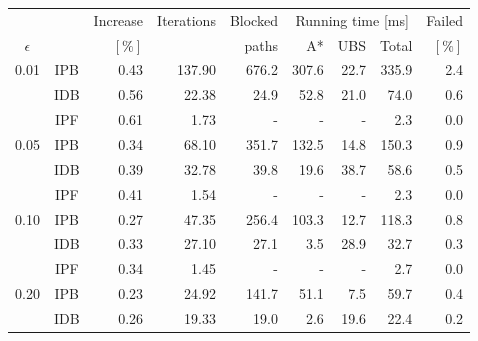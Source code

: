 \begin{tabular}{ccrrrrrrr}
\toprule
            & & Increase & Iterations & Blocked & \multicolumn{3}{c}{Running time [ms]} & Failed \\ \cmidrule(lr){6-8}
 $\epsilon$ & &   $[\%]$ &            &   paths & A* & UBS & Total                      & $[\%]$ \\
\midrule
\multirow{3}{*}{0.01} & IPB &                     0.43 &          137.90 &                676.2 &                      307.6 &               22.7 &            335.9 &     2.4 \\
                      & IDB &                     0.56 &           22.38 &                 24.9 &                       52.8 &               21.0 &             74.0 &     0.6 \\
                      & IPF &                     0.61 &            1.73 &                    - &                          - &                  - &              2.3 &     0.0 \\[2pt]
\multirow{3}{*}{0.05} & IPB &                     0.34 &           68.10 &                351.7 &                      132.5 &               14.8 &            150.3 &     0.9 \\
                      & IDB &                     0.39 &           32.78 &                 39.8 &                       19.6 &               38.7 &             58.6 &     0.5 \\
                      & IPF &                     0.41 &            1.54 &                    - &                          - &                  - &              2.3 &     0.0 \\[2pt]
\multirow{3}{*}{0.10} & IPB &                     0.27 &           47.35 &                256.4 &                      103.3 &               12.7 &            118.3 &     0.8 \\
                      & IDB &                     0.33 &           27.10 &                 27.1 &                        3.5 &               28.9 &             32.7 &     0.3 \\
                      & IPF &                     0.34 &            1.45 &                    - &                          - &                  - &              2.7 &     0.0 \\[2pt]
\multirow{3}{*}{0.20} & IPB &                     0.23 &           24.92 &                141.7 &                       51.1 &                7.5 &             59.7 &     0.4 \\
                      & IDB &                     0.26 &           19.33 &                 19.0 &                        2.6 &               19.6 &             22.4 &     0.2 \\

\end{tabular}
